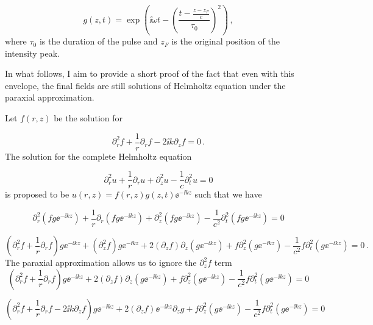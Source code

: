 \documentclass[12pt, class=report, crop=false]{standalone}
\begin{document}
\begin{equation}
  \label{temporal-profile}
  g(z,t) = \exp(\ii \omega t - \left( \frac{t-\frac{z-z_F}{c}}{\tau_0}\right)^2)\,,
\end{equation}
where \(\tau_0\) is the duration of the pulse and \(z_F\) is the original position of the intensity peak.

In what follows, I aim to provide a short proof of the fact that even with this envelope, the final fields are still solutions of Helmholtz equation under the paraxial approximation.

Let \(f(r,z)\) be the solution for

\begin{equation}
  \partial_r^2 f +\frac{1}{r} \partial_r f - 2\ii k \partial_z f = 0\,.
\end{equation}
The solution for the complete Helmholtz equation

\begin{equation}
  \partial_r^2 u +\frac{1}{r} \partial_r u +\partial_z^2 u -\frac{1}{c} \partial_t^2 u = 0
\end{equation}
is proposed to be \(u(r,z) = f(r,z) g(z,t) \ee^{-\ii k z}\) such that we have

\begin{equation*}
  \partial_r^2 (fg\ee^{-\ii k z}) +\frac{1}{r} \partial_r (fg\ee^{-\ii k z}) +\partial_z^2 (fg\ee^{-\ii k z}) -\frac{1}{c^2} \partial_t^2 (fg\ee^{-\ii k z}) = 0
\end{equation*}

\begin{equation*}
  (\partial_r^2 f +\frac{1}{r} \partial_r f) g\ee^{-\ii k z} + (\partial_z^2 f) g\ee^{-\ii k z} + 2 (\partial_z f) \partial_z (g\ee^{-\ii k z}) + f \partial_z^2(g\ee^{-\ii k z}) - \frac{1}{c^2} f \partial_t^2 (g\ee^{-\ii k z}) = 0\,.
\end{equation*}
The paraxial approximation allows us to ignore the \(\partial_z^2 f\) term
\begin{equation*}
  (\partial_r^2 f +\frac{1}{r} \partial_r f) g\ee^{-\ii k z} + 2 (\partial_z f) \partial_z (g\ee^{-\ii k z}) + f \partial_z^2(g\ee^{-\ii k z}) - \frac{1}{c^2} f \partial_t^2 (g\ee^{-\ii k z}) = 0
\end{equation*}

\begin{equation*}
  (\partial_r^2 f +\frac{1}{r} \partial_r f - 2 \ii k \partial_z f) g\ee^{-\ii k z} + 2 (\partial_z f) \ee^{-\ii k z} \partial_z g+ f \partial_z^2(g\ee^{-\ii k z}) - \frac{1}{c^2} f \partial_t^2 (g\ee^{-\ii k z}) = 0
\end{equation*}
\end{document}
